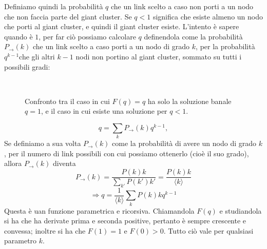 Definiamo quindi la probabilit\`a $q$ che un link scelto a caso non porti a un nodo che non faccia parte del giant cluster. Se $q<1$ significa che esiste almeno un nodo che porti al giant cluster, e quindi il giant cluster esiste. L'intento \`e sapere quando \`e $1$, per far ci\`o possiamo calcolare $q$ definendola come la probabilit\`a $P_{\rightarrow}(k)$ che un link scelto a caso porti a un nodo di grado $k$, per la probabilit\`a $q^{k-1}$che gli altri $k-1$ nodi non portino al giant cluster, sommato su tutti i possibili gradi:
\begin{figure}[t!]
	\centering
	$\;$
	\caption[Esistenza soluzione non banale.]{Confronto tra il caso in cui $F(q)=q$ ha solo la soluzione banale $q=1$, e il caso in cui esiste una soluzione per $q<1$.}
	\label{fig:banalita}
\end{figure}

\begin{equation}
\label{eq:condizione}
	q = \sum_k P_{\rightarrow}(k) q^{k-1},
\end{equation}
Se definiamo a sua volta $P_{\rightarrow}(k)$ come la probabilit\`a di avere un nodo di grado $k$, per il numero di link possibili con cui possiamo ottenerlo (cio\`e il suo grado), allora $P_{\rightarrow}(k)$ diventa
\[P_{\rightarrow}(k) = \frac{P(k)k}{\sum_{k'}P(k')k'} = \frac{P(k)k}{\langle k \rangle}\]
\[\Rightarrow q = \frac{1}{\langle k \rangle}\sum_k P(k)kq^{k-1} \]
Questa \`e uan funzione parametrica e ricorsiva. Chiamandola $F(q)$ e studiandola si ha che ha derivate prima e seconda positive, pertanto \`e sempre crescente e convessa; inoltre si ha che $F(1) = 1$ e $F(0)>0$. Tutto ci\`o vale per qualsiasi parametro $k$. 

